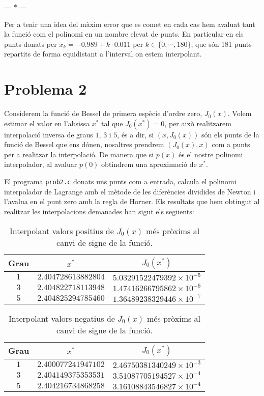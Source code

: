 \documentclass[12pt]{article}
\numberwithin{table}{section}
\numberwithin{figure}{section}
\numberwithin{equation}{section}
\newcommand{\parbreak}{
	\begin{center}
		--- $\ast$ ---
	\end{center} 
}
\begin{document}
\parbreak

Per a tenir una idea del màxim error que es comet en cada cas hem avaluat tant la funció com el polinomi en un nombre elevat de punts. En particular en els punts donats per \( x_k = \num{-0.989} + k \cdot \num{0.011} \) per \( k \in \{0, \cdots, 180\} \), que són 181 punts repartits de forma equidistant a l'interval on estem interpolant.  

\newpage

\section{Problema 2}
Considerem la funció de Bessel de primera espècie d'ordre zero, $J_0(x)$. Volem estimar el valor en l'absissa $x^*$ tal que $J_0(x^*)=0$, per això realitzarem interpolació inversa de graus $1$, $3$ i $5$, és a dir, si $(x, J_0(x))$ són els punts de la funció de Bessel que ens dónen, nosaltres prendrem $(J_0(x), x)$ com a punts per a realitzar la interpolació. De manera que si $p(x)$ és el nostre polinomi interpolador, al avaluar $p(0)$ obtindrem una aproximació de $x^*$.

El programa \texttt{prob2.c} donats uns punts com a entrada, calcula el polinomi interpolador de Lagrange amb el mètode de les diferències dividides de Newton i l'avalua en el punt zero amb la regla de Horner. Els resultats que hem obtingut al realitzar les interpolacions demanades han sigut els següents:

\begin{table}[h!]
	\centering
	\caption{Interpolant valors positius de $J_0(x)$ més pròxims al canvi de signe de la funció.}	
	\begin{tabular}{c|c|c}
		Grau & $x^*$ &$J_0(x^*)$\\
		\hline
		\hline
		$1$ & $2.404728613882804$  &$5.03291522479392\times10^{-5}$\\
		$3$ & $2.404822718113948$ &$1.47416266795862\times10^{-6}$\\
		$5$ & $2.404825294785460$ &$1.36489238329446\times10^{-7}$\\
	\end{tabular}
\end{table}

\begin{table}[h!]
	\centering
	\caption{Interpolant valors negatius de $J_0(x)$ més pròxims al canvi de signe de la funció.}	
	\begin{tabular}{c|c|c}
		Grau & $x^*$ &$J_0(x^*)$\\
		\hline
		\hline
		$1$ & $2.400077241947102$&$2.46750381340249\times10^{-3}$\\
		$3$ & $2.404149375353531$&$3.51087705194527\times10^{-4}$\\
		$5$ &$2.404216734868258$ &$3.16108843546827\times10^{-4}$\\
	\end{tabular}
\end{table}
\end{document}
